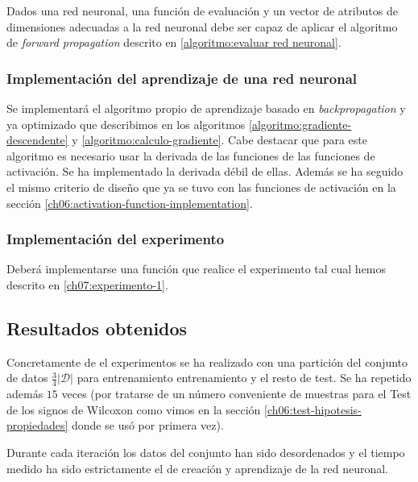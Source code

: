 Dados una red neuronal, una función de evaluación y un vector de atributos de dimensiones adecuadas a la red neuronal debe ser capaz de aplicar el algoritmo de \textit{forward propagation} descrito en \ref{algoritmo:evaluar red neuronal}.

\subsubsection{Implementación del aprendizaje de una red neuronal} 
Se implementará el algoritmo propio de aprendizaje basado en \textit{backpropagation} y ya optimizado 
que describimos en los algoritmos \ref{algoritmo:gradiente-descendente} y \ref{algoritmo:calculo-gradiente}.
Cabe destacar que para este algoritmo es necesario usar la derivada de las funciones de las funciones de activación. Se ha implementado la derivada débil de ellas. Además se ha seguido el mismo criterio de diseño que ya se tuvo con las funciones de activación en la sección \ref{ch06:activation-function-implementation}.

\subsubsection{Implementación del experimento} 
Deberá implementarse una función que realice el 
experimento tal cual hemos descrito en \ref{ch07:experimento-1}.

\subsection{Resultados obtenidos}

Concretamente de el experimentos se ha realizado con 
una partición del conjunto de datos $\frac{3}{4}|\mathcal{D}|$ para entrenamiento entrenamiento 
y el resto de test. Se ha repetido además $15$ veces (por tratarse de un número conveniente de muestras para el Test de los signos de Wilcoxon como vimos en la sección \ref{ch06:test-hipotesis-propiedades} donde se usó por primera vez). 

Durante cada iteración los datos del conjunto han sido desordenados y el tiempo medido ha sido estrictamente el de creación y aprendizaje de la red neuronal. 

